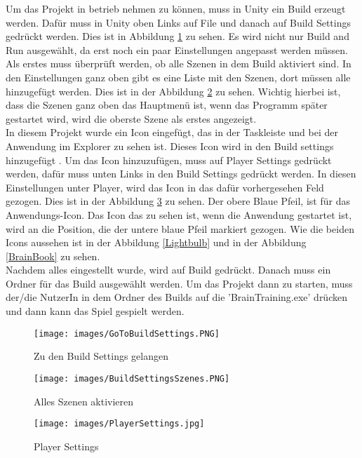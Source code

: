 Um das Projekt in betrieb nehmen zu können, muss in Unity ein Build erzeugt werden. Dafür muss in Unity oben Links auf File und danach auf Build Settings gedrückt werden. Dies ist in Abbildung \ref{GoToBuildSettings} zu sehen. Es wird nicht nur Build and Run ausgewählt, da erst noch ein paar Einstellungen angepasst werden müssen.\\
Als erstes muss überprüft werden, ob alle Szenen in dem Build aktiviert sind. In den Einstellungen ganz oben gibt es eine Liste mit den Szenen, dort müssen alle hinzugefügt werden. Dies ist in der Abbildung \ref{BuildSettingsSzene} zu sehen. Wichtig hierbei ist, dass die Szenen ganz oben das Hauptmenü ist, wenn das Programm später gestartet wird, wird die oberste Szene als erstes angezeigt.\\
In diesem Projekt wurde ein Icon eingefügt, das in der Taskleiste und bei der Anwendung im Explorer zu sehen ist. Dieses Icon wird in den Build settings hinzugefügt \autocite{Glühbirne}. Um das Icon hinzuzufügen, muss auf Player Settings gedrückt werden, dafür muss unten Links in den Build Settings gedrückt werden. In diesen Einstellungen unter Player, wird das Icon in das dafür vorhergesehen Feld gezogen. Dies ist in der Abbildung \ref{PlayerSettings} zu sehen. Der obere Blaue Pfeil, ist für das Anwendungs-Icon. Das Icon das zu sehen ist, wenn die Anwendung gestartet ist, wird an die Position, die der untere blaue Pfeil\autocite{Gehirn} markiert gezogen. Wie die beiden Icons aussehen ist in der Abbildung \ref{Lightbulb} und in der Abbildung \ref{BrainBook} zu sehen.\\
Nachdem alles eingestellt wurde, wird auf Build gedrückt. Danach muss ein Ordner für das Build ausgewählt werden. Um das Projekt dann zu starten, muss der/die NutzerIn in dem Ordner des Builds auf die 'BrainTraining.exe' drücken und dann kann das Spiel gespielt werden.
\begin{figure}[htbp]
  \centering
  \texttt{[image: images/GoToBuildSettings.PNG]}
  \caption{Zu den Build Settings gelangen}
  \label{GoToBuildSettings}
\end{figure}
\begin{figure}[htbp]
  \centering
  \texttt{[image: images/BuildSettingsSzenes.PNG]}
  \caption{Alles Szenen aktivieren}
  \label{BuildSettingsSzene}
\end{figure}
\begin{figure}[htbp]
  \centering
  \texttt{[image: images/PlayerSettings.jpg]}
  \caption{Player Settings}
  \label{PlayerSettings}
\end{figure}

